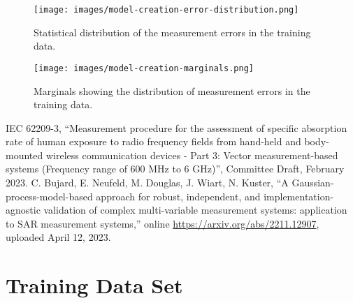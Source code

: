 \documentclass{article}
\begin{document}
\begin{figure} \centering
\texttt{[image: images/model-creation-error-distribution.png]}
\caption{Statistical distribution of the measurement errors in the training data.} \label{fig:creation-errors}
\end{figure}

\begin{figure} \centering
\texttt{[image: images/model-creation-marginals.png]}
\caption{Marginals showing the distribution of measurement errors in the training data.} \label{fig:creation-marginals}
\end{figure}

\FloatBarrier
\begin{thebibliography}{9}
IEC 62209-3, ``Measurement procedure for the assessment of specific absorption rate of human exposure to radio frequency fields from hand-held and body-mounted wireless communication devices - Part 3: Vector measurement-based systems (Frequency range of 600 MHz to 6 GHz)'', Committee Draft, February 2023.
C. Bujard, E. Neufeld, M. Douglas, J. Wiart, N. Kuster, ``A Gaussian-process-model-based approach for robust, independent, and implementation-agnostic validation of complex multi-variable measurement systems: application to SAR measurement systems,'' online \url{https://arxiv.org/abs/2211.12907}, uploaded April 12, 2023.
\end{thebibliography}

\FloatBarrier
\appendix
\section{Training Data Set} \label{sec:training-data}
\end{document}
